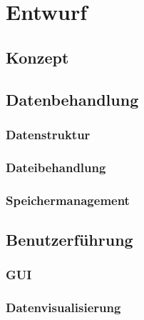 \chapter{Entwurf}


\section{Konzept}

\section{Datenbehandlung}

\subsection{Datenstruktur}

\subsection{Dateibehandlung}

\subsection{Speichermanagement}


\section{Benutzerf\"uhrung}

\subsection{\ac{GUI}}

\subsection{Datenvisualisierung}


